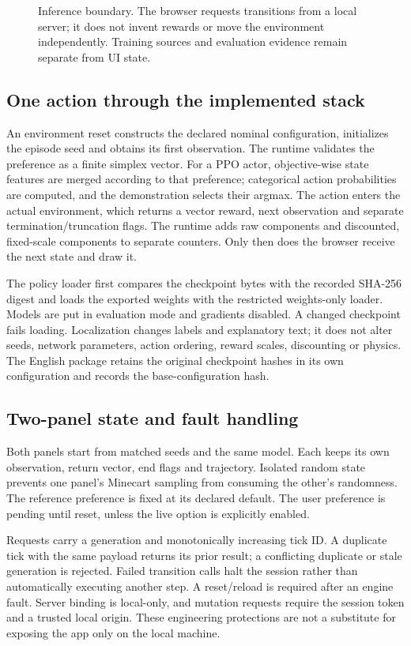 \begin{figure}[htbp]\centering
\resizebox{\textwidth}{!}{}
\caption{Inference boundary. The browser requests transitions from a local
server; it does not invent rewards or move the environment independently.
Training sources and evaluation evidence remain separate from UI state.}
\end{figure}

\subsection{One action through the implemented stack}
An environment reset constructs the declared nominal configuration, initializes
the episode seed and obtains its first observation. The runtime validates the
preference as a finite simplex vector. For a PPO actor, objective-wise state
features are merged according to that preference; categorical action
probabilities are computed, and the demonstration selects their argmax.
The action enters the actual environment, which returns a vector reward,
next observation and separate termination/truncation flags. The runtime adds
raw components and discounted, fixed-scale components to separate counters.
Only then does the browser receive the next state and draw it.

The policy loader first compares the checkpoint bytes with the recorded
SHA-256 digest and loads the exported weights with the restricted weights-only
loader. Models are put in evaluation mode and gradients disabled. A changed
checkpoint fails loading. Localization changes labels and explanatory text;
it does not alter seeds, network parameters, action ordering, reward scales,
discounting or physics. The English package retains the original checkpoint
hashes in its own configuration and records the base-configuration hash.

\subsection{Two-panel state and fault handling}
Both panels start from matched seeds and the same model. Each keeps its own
observation, return vector, end flags and trajectory. Isolated random state
prevents one panel's Minecart sampling from consuming the other's randomness.
The reference preference is fixed at its declared default. The user preference
is pending until reset, unless the live option is explicitly enabled.

Requests carry a generation and monotonically increasing tick ID. A duplicate
tick with the same payload returns its prior result; a conflicting duplicate or
stale generation is rejected. Failed transition calls halt the session rather
than automatically executing another step. A reset/reload is required after
an engine fault. Server binding is local-only, and mutation requests require
the session token and a trusted local origin. These engineering protections
are not a substitute for exposing the app only on the local machine.

